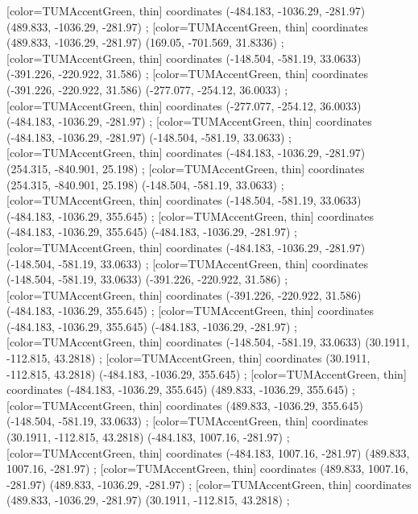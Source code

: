         [color=TUMAccentGreen, thin] coordinates { (-484.183, -1036.29, -281.97) (489.833, -1036.29, -281.97) };
        [color=TUMAccentGreen, thin] coordinates { (489.833, -1036.29, -281.97) (169.05, -701.569, 31.8336) };
        [color=TUMAccentGreen, thin] coordinates { (-148.504, -581.19, 33.0633) (-391.226, -220.922, 31.586) };
        [color=TUMAccentGreen, thin] coordinates { (-391.226, -220.922, 31.586) (-277.077, -254.12, 36.0033) };
        [color=TUMAccentGreen, thin] coordinates { (-277.077, -254.12, 36.0033) (-484.183, -1036.29, -281.97) };
        [color=TUMAccentGreen, thin] coordinates { (-484.183, -1036.29, -281.97) (-148.504, -581.19, 33.0633) };
        [color=TUMAccentGreen, thin] coordinates { (-484.183, -1036.29, -281.97) (254.315, -840.901, 25.198) };
        [color=TUMAccentGreen, thin] coordinates { (254.315, -840.901, 25.198) (-148.504, -581.19, 33.0633) };
        [color=TUMAccentGreen, thin] coordinates { (-148.504, -581.19, 33.0633) (-484.183, -1036.29, 355.645) };
        [color=TUMAccentGreen, thin] coordinates { (-484.183, -1036.29, 355.645) (-484.183, -1036.29, -281.97) };
        [color=TUMAccentGreen, thin] coordinates { (-484.183, -1036.29, -281.97) (-148.504, -581.19, 33.0633) };
        [color=TUMAccentGreen, thin] coordinates { (-148.504, -581.19, 33.0633) (-391.226, -220.922, 31.586) };
        [color=TUMAccentGreen, thin] coordinates { (-391.226, -220.922, 31.586) (-484.183, -1036.29, 355.645) };
        [color=TUMAccentGreen, thin] coordinates { (-484.183, -1036.29, 355.645) (-484.183, -1036.29, -281.97) };
        [color=TUMAccentGreen, thin] coordinates { (-148.504, -581.19, 33.0633) (30.1911, -112.815, 43.2818) };
        [color=TUMAccentGreen, thin] coordinates { (30.1911, -112.815, 43.2818) (-484.183, -1036.29, 355.645) };
        [color=TUMAccentGreen, thin] coordinates { (-484.183, -1036.29, 355.645) (489.833, -1036.29, 355.645) };
        [color=TUMAccentGreen, thin] coordinates { (489.833, -1036.29, 355.645) (-148.504, -581.19, 33.0633) };
        [color=TUMAccentGreen, thin] coordinates { (30.1911, -112.815, 43.2818) (-484.183, 1007.16, -281.97) };
        [color=TUMAccentGreen, thin] coordinates { (-484.183, 1007.16, -281.97) (489.833, 1007.16, -281.97) };
        [color=TUMAccentGreen, thin] coordinates { (489.833, 1007.16, -281.97) (489.833, -1036.29, -281.97) };
        [color=TUMAccentGreen, thin] coordinates { (489.833, -1036.29, -281.97) (30.1911, -112.815, 43.2818) };

